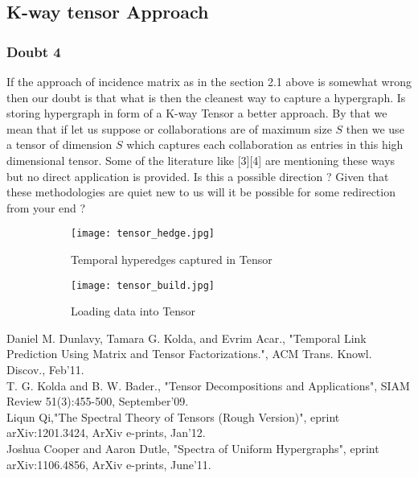 \documentclass[a4paper,12pt]{article}
\begin{document}
\subsection{K-way tensor Approach}
\subsubsection{Doubt 4}

If the approach of incidence matrix as in the section 2.1 above is somewhat wrong then our doubt is that what is then the cleanest way to capture a hypergraph. Is storing hypergraph in form of a K-way Tensor a better approach. By that we mean that if let us suppose or collaborations are of maximum size $S$ then we use a tensor of dimension $S$ which captures each collaboration as entries in this high dimensional tensor. Some of the literature like [3][4] are mentioning these ways but no direct application is provided. Is this a possible direction ? Given that these methodologies are quiet new to us will it be possible for some redirection from your end ? 

\begin{figure}
\centering
\begin{subfigure}[b]{0.4\textwidth}
\centering
\texttt{[image: tensor\_hedge.jpg]}
\caption{Temporal hyperedges captured in Tensor}
\label{fig:Top-100 case}
\end{subfigure}%

\begin{subfigure}[b]{0.4\textwidth}
\centering
\texttt{[image: tensor\_build.jpg]}
\caption{Loading data into Tensor}
\label{fig:Top-100 case}
\end{subfigure}%

\caption{}
\end{figure}

\begin{thebibliography}{9}

Daniel M. Dunlavy, Tamara G. Kolda, and Evrim Acar., "Temporal Link Prediction Using Matrix and Tensor Factorizations.", ACM Trans. Knowl. Discov., Feb'11. \\

T. G. Kolda and B. W. Bader., "Tensor Decompositions and Applications", SIAM Review 51(3):455-500, September'09. \\

Liqun Qi,"The Spectral Theory of Tensors (Rough Version)", eprint arXiv:1201.3424, ArXiv e-prints, Jan'12.\\

Joshua Cooper and Aaron Dutle, "Spectra of Uniform Hypergraphs", eprint arXiv:1106.4856, ArXiv e-prints, June'11.\\

\end{thebibliography}
\end{document}
